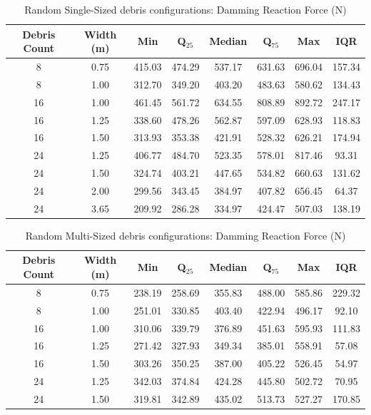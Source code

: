 \documentclass{article}
\begin{document}
{\begin{table}[h!]
\centering
\caption{Random Single-Sized debris configurations: Damming Reaction Force (N)}
\begin{tabular}{cccccccc}
\toprule
\textbf{Debris Count} & \textbf{Width (m)} & \textbf{Min} & \textbf{Q$_{25}$} & \textbf{Median} & \textbf{Q$_{75}$} & \textbf{Max} & \textbf{IQR} \\
\midrule
8 & 0.75 & 415.03 & 474.29 & 537.17 & 631.63 & 696.04 & 157.34 \\
8 & 1.00 & 312.70 & 349.20 & 403.20 & 483.63 & 580.62 & 134.43 \\
16 & 1.00 & 461.45 & 561.72 & 634.55 & 808.89 & 892.72 & 247.17 \\
16 & 1.25 & 338.60 & 478.26 & 562.87 & 597.09 & 628.93 & 118.83 \\
16 & 1.50 & 313.93 & 353.38 & 421.91 & 528.32 & 626.21 & 174.94 \\
24 & 1.25 & 406.77 & 484.70 & 523.35 & 578.01 & 817.46 & 93.31 \\
24 & 1.50 & 324.74 & 403.21 & 447.65 & 534.82 & 660.63 & 131.62 \\
24 & 2.00 & 299.56 & 343.45 & 384.97 & 407.82 & 656.45 & 64.37 \\
24 & 3.65 & 209.92 & 286.28 & 334.97 & 424.47 & 507.03 & 138.19 \\
\bottomrule
\end{tabular}
\end{table}

\begin{table}[h!]
\centering
\caption{Random Multi-Sized debris configurations: Damming Reaction Force (N)}
\begin{tabular}{cccccccc}
\toprule
\textbf{Debris Count} & \textbf{Width (m)} & \textbf{Min} & \textbf{Q$_{25}$} & \textbf{Median} & \textbf{Q$_{75}$} & \textbf{Max} & \textbf{IQR} \\
\midrule
8 & 0.75 & 238.19 & 258.69 & 355.83 & 488.00 & 585.86 & 229.32 \\
8 & 1.00 & 251.01 & 330.85 & 403.40 & 422.94 & 496.17 & 92.10 \\
16 & 1.00 & 310.06 & 339.79 & 376.89 & 451.63 & 595.93 & 111.83 \\
16 & 1.25 & 271.42 & 327.93 & 349.34 & 385.01 & 558.91 & 57.08 \\
16 & 1.50 & 303.26 & 350.25 & 387.00 & 405.22 & 526.45 & 54.97 \\
24 & 1.25 & 342.03 & 374.84 & 424.28 & 445.80 & 502.72 & 70.95 \\
24 & 1.50 & 319.81 & 342.89 & 435.02 & 513.73 & 527.27 & 170.85 \\
\bottomrule
\end{tabular}
\end{table}

}
\end{document}
